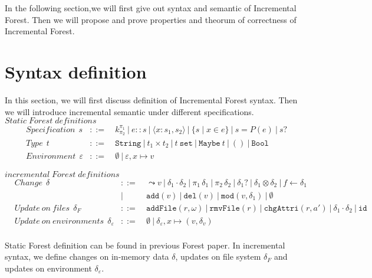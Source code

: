 \documentclass[10pt,twoside,a4paper]{article}
\theoremstyle{theorem}
\theoremstyle{lemma}
\theoremstyle{property}
\theoremstyle{definition}
\theoremstyle{assumption}
\def\fst{\pi_1}
\def\snd{\pi_2}
\begin{document}
In the following section,we will first give out syntax and semantic of Incremental Forest. Then we will propose and prove properties and theorum of correctness of Incremental Forest.

\section{Syntax definition}

In this section, we will first discuss definition of Incremental Forest syntax. Then we will introduce incremental semantic under different specifications.\\

$\boxed{Static\; Forest\; definitions}$
\begin{align*}
	& Specification ~~s	& ::= 	& ~k^{\pi_1}_{\pi_2} ~|~ e::s ~|~ \langle x : s_1, s_2 \rangle ~|~ \{s\mid x\in e\} ~|~ s = P(e) ~|~ s? \\
	& Type ~~t & ::= 	& ~\mathtt{String} ~|~ t_1 \times t_2 ~|~ t~\mathtt{set} ~|~ \mathtt{Maybe}~t ~|~ \mathtt{()} ~|~ \mathtt{Bool}\\
	& Environment ~~\varepsilon & ::= & ~\emptyset ~|~ \varepsilon, x\mapsto v
\end{align*}

$\boxed{incremental\;Forest\;definitions}$
\begin{align*}
	& Change ~~\delta & ::= 	& ~\leadsto v ~|~ \delta_1 \cdot \delta_2 ~|~ \fst\,\delta_1 ~|~ \snd\,\delta_2 ~|~ \delta_1? ~|~ \delta_1 \otimes \delta_2 ~|~ f \leftarrow \delta_1\\
	& 		& |		&~ \mathtt{add}(v) ~|~ \mathtt{del}(v) ~|~ \mathtt{mod}(v, \delta_1) ~|~ \emptyset \\
	& Update~on~files ~~\delta_F 	& ::= 	& ~\mathtt{addFile}(r,\omega) ~|~ \mathtt{rmvFile}(r) ~|~ \mathtt{chgAttri}(r,a') ~|~ \delta_1 \cdot \delta_2 ~|~ \mathtt{id}\\
	& Update~on~environments ~~\delta_\varepsilon & ::= & ~\emptyset ~|~ \delta_\varepsilon, x \mapsto (v,\delta_v) \\
\end{align*}

Static Forest definition can be found in previous Forest paper. In incremental syntax, we define changes on in-memory data $\delta$, updates on file system $\delta_F$ and updates on environment $\delta_\varepsilon$. \\
\end{document}
